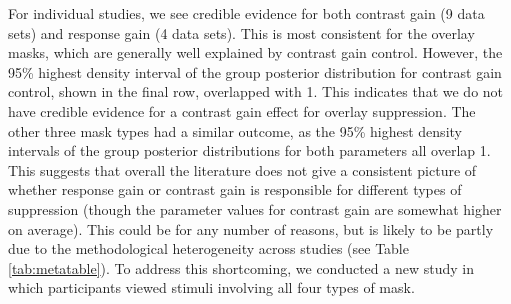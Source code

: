 \documentclass[]{article}
\begin{document}
For individual studies, we see credible evidence for both contrast gain (9 data sets) and response gain (4 data sets). This is most consistent for the overlay masks, which are generally well explained by contrast gain control. However, the 95\% highest density interval of the group posterior distribution for contrast gain control, shown in the final row, overlapped with 1. This indicates that we do not have credible evidence for a contrast gain effect for overlay suppression. The other three mask types had a similar outcome, as the 95\% highest density intervals of the group posterior distributions for both parameters all overlap 1. This suggests that overall the literature does not give a consistent picture of whether response gain or contrast gain is responsible for different types of suppression (though the parameter values for contrast gain are somewhat higher on average). This could be for any number of reasons, but is likely to be partly due to the methodological heterogeneity across studies (see Table \ref{tab:metatable}). To address this shortcoming, we conducted a new study in which participants viewed stimuli involving all four types of mask.
\end{document}
